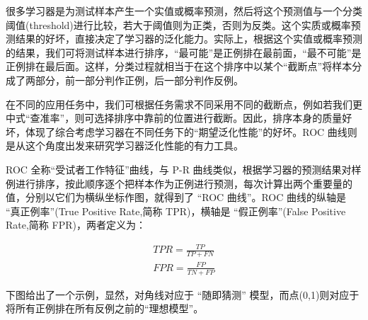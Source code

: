 很多学习器是为测试样本产生一个实值或概率预测，然后将这个预测值与一个分类阈值(threshold)进行比较，若大于阈值则为正类，否则为反类。这个实质或概率预测结果的好坏，直接决定了学习器的泛化能力。实际上，根据这个实值或概率预测的结果，我们可将测试样本进行排序，``最可能''是正例排在最前面，``最不可能''是正例排在最后面。这样，分类过程就相当于在这个排序中以某个``截断点''将样本分成了两部分，前一部分判作正例，后一部分判作反例。

在不同的应用任务中，我们可根据任务需求不同采用不同的截断点，例如若我们更中式``查准率''，则可选择排序中靠前的位置进行截断。因此，排序本身的质量好坏，体现了综合考虑学习器在不同任务下的``期望泛化性能''的好坏。ROC 曲线则是从这个角度出发来研究学习器泛化性能的有力工具。

ROC 全称``受试者工作特征''曲线，与 P-R 曲线类似，根据学习器的预测结果对样例进行排序，按此顺序逐个把样本作为正例进行预测，每次计算出两个重要量的值，分别以它们为横纵坐标作图，就得到了 ``ROC 曲线''。ROC 曲线的纵轴是 ``真正例率''(True Positive Rate,简称 TPR)，横轴是 ``假正例率''(False Positive Rate,简称 FPR)，两者定义为：

\begin{align}
    TPR = \frac{TP}{TP+FN} \\
    FPR = \frac{FP}{TN+FP} 
\end{align}

下图给出了一个示例，显然，对角线对应于 ``随即猜测'' 模型，而点(0,1)则对应于将所有正例排在所有反例之前的``理想模型''。

